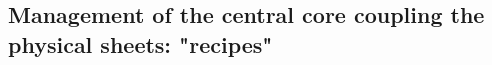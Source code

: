 \documentclass[12pt,a4paper]{article}%
\begin{document}
\begin{appendix}
\section{Management of the central core coupling the physical sheets: "recipes"}   
\end{appendix}
\end{document}
